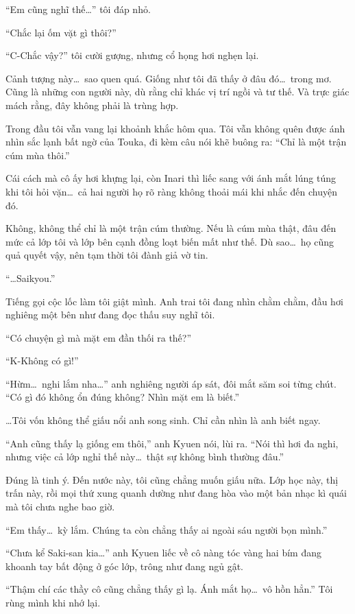 \documentclass[../main.tex]{subfiles}
\begin{document}
``Em cũng nghĩ thế\dots'' tôi đáp nhỏ.

``Chắc lại ốm vặt gì thôi?''

``C-Chắc vậy?'' tôi cười gượng, nhưng cổ họng hơi nghẹn lại.

Cảnh tượng này\dots\ sao quen quá. Giống như tôi đã thấy ở đâu đó\dots\ trong mơ. Cũng là những con người này, dù rằng chỉ khác vị trí ngồi và tư thế. Và trực giác mách rằng, đây không phải là trùng hợp.

Trong đầu tôi vẫn vang lại khoảnh khắc hôm qua. Tôi vẫn không quên được ánh nhìn sắc lạnh bất ngờ của Touka, đi kèm câu nói khẽ buông ra: ``Chỉ là một trận cúm mùa thôi.''

Cái cách mà cô ấy hơi khựng lại, còn Inari thì liếc sang với ánh mắt lúng túng khi tôi hỏi vặn\dots\ cả hai người họ rõ ràng không thoải mái khi nhắc đến chuyện đó.

Không, không thể chỉ là một trận cúm thường. Nếu là cúm mùa thật, đâu đến mức cả lớp tôi và lớp bên cạnh đồng loạt biến mất như thế. Dù sao\dots\ họ cũng quả quyết vậy, nên tạm thời tôi đành giả vờ tin.

``\dots Saikyou.''

Tiếng gọi cộc lốc làm tôi giật mình. Anh trai tôi đang nhìn chằm chằm, đầu hơi nghiêng một bên như đang đọc thấu suy nghĩ tôi.

``Có chuyện gì mà mặt em đần thối ra thế?''

``K-Không có gì!''

``Hừm\dots\ nghi lắm nha\dots'' anh nghiêng người áp sát, đôi mắt săm soi từng chút. ``Có gì đó không ổn đúng không? Nhìn mặt em là biết.''

\dots Tôi vốn không thể giấu nổi anh song sinh. Chỉ cần nhìn là anh biết ngay.

``Anh cũng thấy lạ giống em thôi,'' anh Kyuen nói, lùi ra. ``Nói thì hơi đa nghi, nhưng việc cả lớp nghỉ thế này\dots\ thật sự không bình thường đâu.''

Đúng là tinh ý. Đến nước này, tôi cũng chẳng muốn giấu nữa. Lớp học này, thị trấn này, rồi mọi thứ xung quanh dường như đang hòa vào một bản nhạc kì quái mà tôi chưa nghe bao giờ.

``Em thấy\dots\ kỳ lắm. Chúng ta còn chẳng thấy ai ngoài sáu người bọn mình.''

``Chưa kể Saki-san kia\dots'' anh Kyuen liếc về cô nàng tóc vàng hai bím đang khoanh tay bất động ở góc lớp, trông như đang ngủ gật.

``Thậm chí các thầy cô cũng chẳng thấy gì lạ. Ánh mắt họ\dots\ vô hồn hẳn.'' Tôi rùng mình khi nhớ lại.
\end{document}
